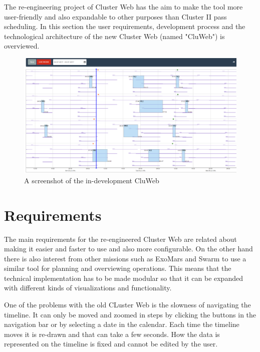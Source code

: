 
The re-engineering project of Cluster Web has the aim to make the tool more user-friendly and also expandable to other purposes than Cluster II pass scheduling. In this section the user requirements, development process and the technological architecture of the new Cluster Web (named "CluWeb") is overviewed.

\begin{figure}[ht]
  \begin{center}
    \includegraphics*[width=1\textwidth]{cluweb_dev}
  \end{center}
  \caption{A screenshot of the in-development CluWeb}
  \label{fig:cluweb}
\end{figure}

\section{Requirements}
The main requirements for the re-engineered Cluster Web are related about making it easier and faster to use and also more configurable.  On the other hand there is also interest from other missions such as ExoMars and Swarm to use a similar tool for planning and overviewing operations. This means that the technical implementation has to be made modular so that it can be expanded with different kinds of visualizations and functionality.

One of the problems with the old CLuster Web is the slowness of navigating the timeline. It can only be moved and zoomed in steps by clicking the buttons in the navigation bar or by selecting a date in the calendar. Each time the timeline moves it is re-drawn and that can take a few seconds. How the data is represented on the timeline is fixed and cannot be edited by the user.

